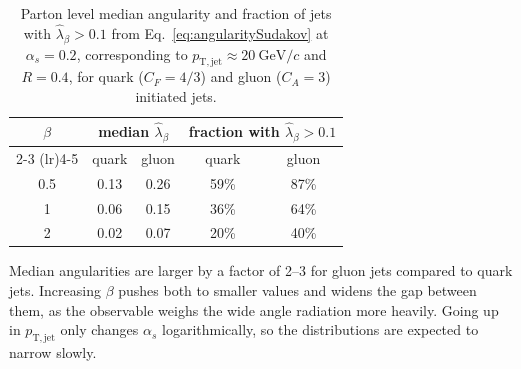 \begin{table}[htbp]
	\centering
	\begin{tabular}{c c c c c}
		\toprule
		\multirow{2}{*}{\(\beta\)} & \multicolumn{2}{c}{median \(\hat{\lambda}_\beta\)} & \multicolumn{2}{c}{fraction with \(\hat{\lambda}_\beta > 0.1\)} \\
		\cmidrule(lr){2-3} \cmidrule(lr){4-5}
		 & quark & gluon & quark & gluon \\
		\midrule
		0.5 & 0.13  & 0.26  & 59\% & 87\% \\
		1   & 0.06  & 0.15  & 36\% & 64\% \\
		2   & 0.02  & 0.07  & 20\% & 40\% \\
		\bottomrule
	\end{tabular}
	\caption[Leading logarithmic estimates of jet angularities at RHIC]{Parton level median angularity and fraction of jets with \(\hat{\lambda}_\beta > 0.1\) from Eq.~\ref{eq:angularitySudakov} at \(\alpha_s = 0.2\), corresponding to \(p_\mathrm{T, jet} \approx 20~\mathrm{GeV}/c\) and \(R = 0.4\), for quark (\(C_F = 4/3\)) and gluon (\(C_A = 3\)) initiated jets.}
	\label{tab:angularityEstimate}
\end{table}

Median angularities are larger by  a factor of 2--3 for gluon jets compared to quark jets. 
%
Increasing \(\beta\) pushes both to smaller values and widens the gap between them, as the observable weighs the wide angle radiation more heavily. 
%
Going up in \(p_\mathrm{T, jet}\) only changes \(\alpha_s\) logarithmically, so the distributions are expected to narrow slowly. 

